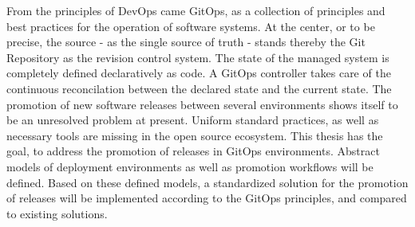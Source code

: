 
\noindent
From the principles of DevOps came GitOps,
as a collection of principles and best practices
for the operation of software systems. At the center,
or to be precise, the source - as the single source of truth -
stands thereby the Git Repository as the revision control system.
The state of the managed system is
completely defined declaratively as code. A GitOps controller
takes care of the continuous reconcilation between the
declared state and the current state.
The promotion of new software releases between several environments
shows itself to be an unresolved problem at present.
Uniform standard practices, as well as necessary tools are missing in the open source ecosystem.
This thesis has the goal,
to address the promotion of releases in GitOps environments.
Abstract models of deployment environments as well as promotion workflows
will be defined.
Based on these defined models,
a standardized solution for the promotion of releases
will be implemented according to the GitOps principles,
and compared to existing solutions.



